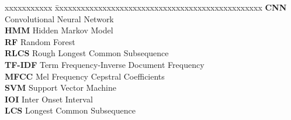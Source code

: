 \abbreviations
\noindent 
\begin{tabbing}
xxxxxxxxxxx \= xxxxxxxxxxxxxxxxxxxxxxxxxxxxxxxxxxxxxxxxxxxxxxxx \kill
\textbf{CNN} \> Convolutional Neural Network \\
\textbf{HMM}   \> Hidden Markov Model \\
\textbf{RF} \> Random Forest \\
\textbf{RLCS} \> Rough Longest Common Subsequence \\
\textbf{TF-IDF} \> Term Frequency-Inverse Document Frequency \\
\textbf{MFCC}   \> Mel Frequency Cepstral Coefficients \\
\textbf{SVM} \> Support Vector Machine \\
\textbf{IOI} \> Inter Onset Interval \\
\textbf{LCS} \> Longest Common Subsequence \\
\end{tabbing}
